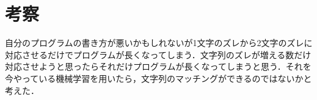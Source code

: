 \documentclass[dvipdfmx]{jsarticle}
\begin{document}
\section{考察}
自分のプログラムの書き方が悪いかもしれないが1文字のズレから2文字のズレに対応させるだけでプログラムが長くなってしまう．文字列のズレが増える数だけ対応させようと思ったらそれだけプログラムが長くなってしまうと思う．それを今やっている機械学習を用いたら，文字列のマッチングができるのではないかと考えた．
\end{document}
